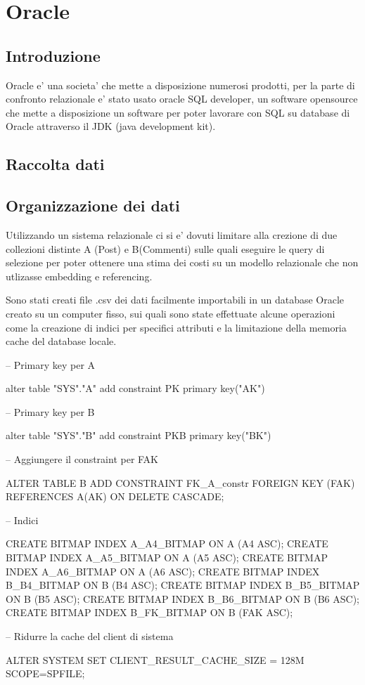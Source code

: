 \chapter{Oracle}

\section{Introduzione}

Oracle e' una societa' che mette a disposizione numerosi prodotti, per la parte di confronto relazionale e' stato usato oracle SQL developer, un software opensource che 
mette a disposizione un software per poter lavorare con SQL su database di Oracle attraverso il JDK (java development kit).

\section{Raccolta dati}

\section{Organizzazione dei dati}

Utilizzando un sistema relazionale ci si e' dovuti limitare alla crezione di due collezioni distinte A (Post) e B(Commenti) sulle quali eseguire le query di selezione per poter
ottenere una stima dei costi su un modello relazionale che non utlizasse embedding e referencing.

Sono stati creati file .csv dei dati facilmente importabili in un database Oracle creato su un computer fisso, sui quali sono state effettuate alcune operazioni come la creazione di 
indici per specifici attributi e la limitazione della memoria cache del database locale. 

\begin{Verbatim*}

-- Primary key per A

alter table "SYS"."A" add constraint PK primary key("AK") 

-- Primary key per B

alter table "SYS"."B" add constraint PKB primary key("BK") 

-- Aggiungere il constraint per FAK

ALTER TABLE B
  ADD CONSTRAINT FK_A_constr FOREIGN KEY (FAK)     
      REFERENCES A(AK)
      ON DELETE CASCADE;

-- Indici

CREATE BITMAP INDEX A_A4_BITMAP ON A (A4 ASC);
CREATE BITMAP INDEX A_A5_BITMAP ON A (A5 ASC);
CREATE BITMAP INDEX A_A6_BITMAP ON A (A6 ASC);
CREATE BITMAP INDEX B_B4_BITMAP ON B (B4 ASC);
CREATE BITMAP INDEX B_B5_BITMAP ON B (B5 ASC);
CREATE BITMAP INDEX B_B6_BITMAP ON B (B6 ASC);
CREATE BITMAP INDEX B_FK_BITMAP ON B (FAK ASC);

-- Ridurre la cache del client di sistema

ALTER SYSTEM SET CLIENT_RESULT_CACHE_SIZE = 128M SCOPE=SPFILE;
 
\end{Verbatim*}

